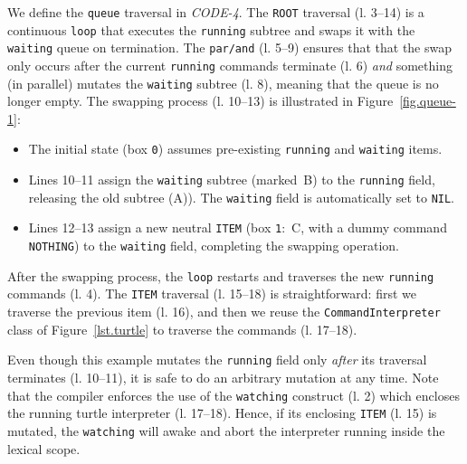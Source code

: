 \documentclass{sig-alternate}
\newcommand{\code}[1] {{\small{\texttt{#1}}}}
\newcommand{\MM}[1] {\textcircled{\tiny{\textsf{#1}}}}
\begin{document}
We define the \code{queue} traversal in \emph{CODE-4}.
%
The \code{ROOT} traversal (l. 3--14) is a continuous \code{loop} that 
executes the \code{running} subtree and swaps it with the \code{waiting} queue 
on termination.
The \code{par/and} (l. 5--9) ensures that that the swap only occurs after 
the current \code{running} commands terminate (l. 6) \emph{and} something (in 
parallel) mutates the \code{waiting} subtree (l. 8), meaning that the queue 
is no longer empty.
The swapping process (l. 10--13) is illustrated in Figure~\ref{fig.queue-1}: 
%
\begin{itemize}
%
\item The initial state (box \code{0}) assumes pre-existing \code{running} and 
\code{waiting} items.
%
\item Lines 10--11 assign the \code{waiting} subtree (marked~\MM{B}) to the 
\code{running} field, releasing the old subtree (\MM{A})).
The \code{waiting} field is automatically set to \code{NIL}.
%
\item Lines 12--13 assign a new neutral \code{ITEM} (box \code{1}:~\MM{C}, with 
a dummy command \code{NOTHING}) to the \code{waiting} field, completing the 
swapping operation.
%
\end{itemize}
%
After the swapping process, the \code{loop} restarts and traverses the new 
\code{running} commands (l. 4).
%
The \code{ITEM} traversal (l. 15--18) is straightforward:
first we traverse the previous item (l. 16), and then we reuse the 
\code{CommandInterpreter} class of Figure~\ref{lst.turtle} to traverse the 
commands (l. 17--18).

Even though this example mutates the \code{running} field only \emph{after} its 
traversal terminates (l. 10--11), it is safe to do an arbitrary mutation at 
any time.
Note that the compiler enforces the use of the \code{watching} construct (l. 
2) which encloses the running turtle interpreter (l. 17--18).
Hence, if its enclosing \code{ITEM} (l. 15) is mutated, the \code{watching} 
will awake and abort the interpreter running inside the lexical scope.
\end{document}
